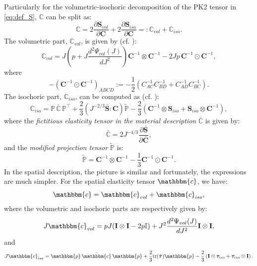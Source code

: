 \documentclass{sfuthesis}
\numberwithin{equation}{section}
\numberwithin{figure}{chapter}
\numberwithin{table}{chapter}
\theoremstyle{definition}
\def\*#1{{\mathbf{#1}}} %
\newcommand{\pder}[2]{\dfrac{\partial #1}{\partial #2}}
\newcommand{\der}[2]{\dfrac{d #1}{d #2}}
\newcommand{\C}{\mathbb{C}}
\newcommand{\T}{\top}
\renewcommand{\c}{\mathbbm{c}}
\renewcommand{\P}{\mathbb{P}}
\newcommand{\p}{\mathbbm{p}}
\def\btau{{\bm{\tau}}}
\begin{document}
Particularly for the volumetric-isochoric decomposition of the PK2 tensor in \eqref{eq:def_S}, $\C$ can be split as:
\begin{equation} \label{eq:def_C}
\C = 2 \pder{\*S_{vol}}{\*C} + 2\pder{\*S_{iso}}{\*C} =: \C_{vol} + \C_{iso}.
\end{equation}
The volumetric part, $\C_{vol}$, is given by (cf. \cite[Eq. (6.166)]{HolzapfelBook}):
\begin{equation}
\C_{vol} = J \left( p + J \der{^2\Psi_{vol}(J)}{J^2} \right) \*C^{-1} \otimes \*C^{-1} - 2Jp \, \*C^{-1} \odot \*C^{-1},
\end{equation}
where
\begin{equation}
-\left( \*C^{-1} \odot \*C^{-1} \right)_{ABCD} := -\dfrac{1}{2} \left( C_{AC}^{-1} C_{BD}^{-1} + C^{-1}_{AD} C^{-1}_{BC} \right).
\end{equation}
The isochoric part, $\C_{iso}$, can be computed as (cf. \cite[Example 6.8]{HolzapfelBook}):
\begin{equation}
\C_{iso} = \P \, \bar{\C} \, \P^\T + \dfrac{2}{3} \left(J^{-2/3} \bar{\*S} : \*C \right) \tilde{\P} - \dfrac{2}{3} \left( \*C^{-1} \otimes \*S_{iso} + \*S_{iso} \otimes \*C^{-1} \right),
\end{equation}
where the \textit{fictitious elasticity tensor in the material description} $\bar{\C}$ is given by:
\begin{equation} \label{eq:def_C_bar}
    \bar{\C} = 2 J^{-4/3} \pder{\bar{\*S}}{\bar{\*C}},
\end{equation}
and the \textit{modified projection tensor} $\tilde{\P}$ is:
\begin{equation}
    \tilde{\P} = \*C^{-1} \otimes \*C^{-1} - \dfrac{1}{3} \*C^{-1} \odot \*C^{-1}.
\end{equation}
In the spatial description, the picture is similar and fortunately, the expressions are much simpler. For the spatial elasticity tensor $\c$, we have:
\begin{equation} \label{eq:def_c}
\c = \c_{vol} + \c_{iso},
\end{equation}
where the volumetric and isochoric parts are respectively given by:
\begin{equation}
J \c_{vol} = pJ(\*I \otimes \*I - 2p\mathbb{I}) + J^2 \der{^2 \Psi_{vol}(J)}{J^2} \*I \otimes \*I,
\end{equation}
and
\begin{equation} \label{eq:Jc_iso}
J\c_{iso} = \p \, \bar{\c} \, \p + \dfrac{2}{3} \mathrm{tr}(\bar{\btau}) \p - \dfrac{2}{3} \left( \*I \otimes \btau_{iso} + \btau_{iso} \otimes \*I \right).
\end{equation}
\end{document}

